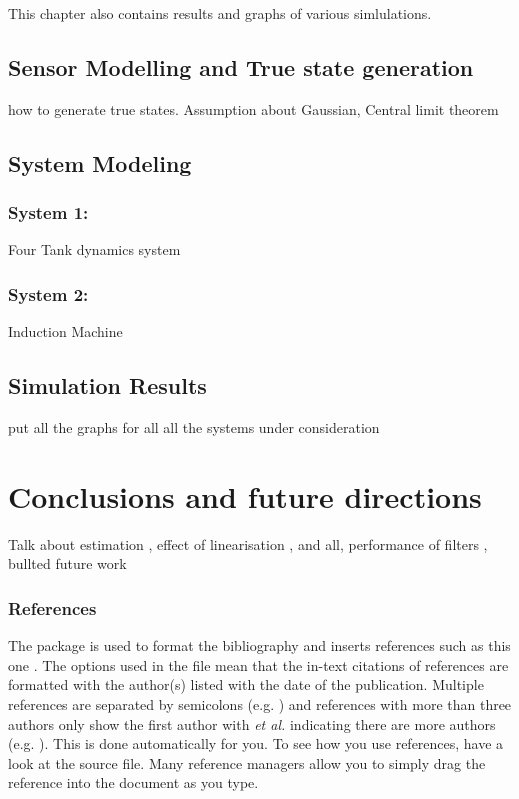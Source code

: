 This chapter also contains results and graphs of various simlulations.
\section{Sensor Modelling and True state generation}
how to generate true states. Assumption about Gaussian, Central limit theorem
\section{System Modeling}
\subsection{System 1:}
Four Tank dynamics system

\subsection{System 2:}
Induction Machine

\section{Simulation Results}
put all the graphs for all all the systems under consideration

\chapter{Conclusions and future directions}
Talk about estimation , effect of linearisation , and all, performance of filters , bullted future work




\subsection{References}

The  package is used to format the bibliography and inserts references such as this one \parencite{Reference1}. The options used in the  file mean that the in-text citations of references are formatted with the author(s) listed with the date of the publication. Multiple references are separated by semicolons (e.g. \parencite{Reference2, Reference1}) and references with more than three authors only show the first author with \emph{et al.} indicating there are more authors (e.g. \parencite{Reference3}). This is done automatically for you. To see how you use references, have a look at the  source file. Many reference managers allow you to simply drag the reference into the document as you type.

